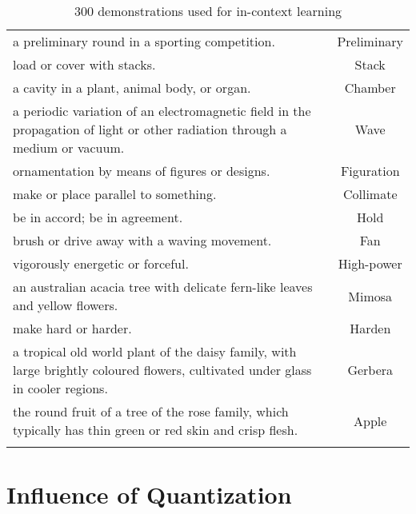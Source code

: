 \documentclass{article}
\begin{document}
\begin{longtable}{p{12cm}c}
a preliminary round in a sporting competition. & Preliminary\\
load or cover with stacks. & Stack\\
a cavity in a plant, animal body, or organ. & Chamber\\
a periodic variation of an electromagnetic field in the propagation of light or other radiation through a medium or vacuum. & Wave\\
ornamentation by means of figures or designs. & Figuration\\
make or place parallel to something. & Collimate\\
be in accord; be in agreement. & Hold\\
brush or drive away with a waving movement. & Fan\\
vigorously energetic or forceful. & High-power\\
an australian acacia tree with delicate fern-like leaves and yellow flowers. & Mimosa\\
make hard or harder. & Harden\\
a tropical old world plant of the daisy family, with large brightly coloured flowers, cultivated under glass in cooler regions. & Gerbera\\
the round fruit of a tree of the rose family, which typically has thin green or red skin and crisp flesh. & Apple\\
\caption{300 demonstrations used for in-context learning}
\end{longtable}

 
\section{Influence of Quantization}
\label{apx:quant}
\end{document}
